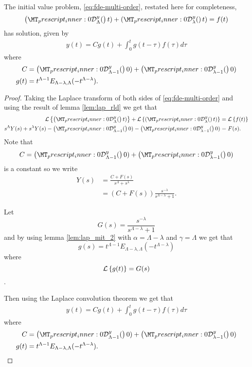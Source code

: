 \begin{lemma}
	The initial value problem, \ref{eq:fde-multi-order}, restated here for completeness,
	\begin{align}
		\rld{0}{\Lambda}{y}(t) + \rld{0}{\lambda}{y}(t) = f(t)
	\end{align}
	has solution, given by
	\begin{align}
		y(t) = C g(t) + \int_0^t g(t-\tau)f(\tau) d\tau
	\end{align}
	where
	\begin{align}
		C &= \rld{0}{\Lambda-1}{y}(0) + \rld{0}{\lambda-1}{y}(0) \\
		g(t) &= t^{\Lambda - 1} E_{\Lambda - \lambda, \Lambda}(-t^{\Lambda - \lambda}).
	\end{align}
\end{lemma}

\begin{proof}

	Taking the Laplace transform of both sides of \ref{eq:fde-multi-order} and using the result of lemma \ref{lem:lap_rld}
	we get that 
	\begin{align}
		\laplace{\rld{0}{\Lambda}{y}(t)} + \laplace{\rld{0}{\lambda}{y}(t)} &= \laplace{f(t)} \\
		s^\Lambda Y(s) + s^\lambda Y(s) - \rld{0}{\Lambda-1}{y}(0) - \rld{0}{\lambda-1}{y}(0) &= F(s).
	\end{align}
	Note that $$ C = \rld{0}{\Lambda-1}{y}(0) + \rld{0}{\lambda-1}{y}(0) $$ is a constant so we write
	\begin{align}
		Y(s) &= \frac{C + F(s)}{s^\Lambda + s^\lambda} \\
			&= \left( C + F(s)\right) \frac{s^{-\lambda}}{s^{\Lambda-\lambda} + 1}.
	\end{align}
	
	Let $$ G(s) = \frac{s^{-\lambda}}{s^{\Lambda-\lambda} + 1} $$
	and by using lemma \ref{lem:lap_mit_2} with $ \alpha = \Lambda - \lambda $ and $ \gamma = \Lambda $
	we get that $$ g(s) = t^{\Lambda  -1}E_{\Lambda - \lambda, \Lambda}(-t^{\Lambda - \lambda}) $$ where 
	$$ \mathcal{L} \left\{ g(t) \right\} = G(s) $$.
	
	Then using the Laplace convolution theorem we get that 
	\begin{align}
		y(t) = C g(t) + \int_0^t g(t-\tau)f(\tau) d\tau
	\end{align}
	where
	\begin{align}
		C &= \rld{0}{\Lambda-1}{y}(0) + \rld{0}{\lambda-1}{y}(0) \\
		g(t) &= t^{\Lambda - 1} E_{\Lambda - \lambda, \Lambda}(-t^{\Lambda - \lambda}).
	\end{align}
\end{proof}

